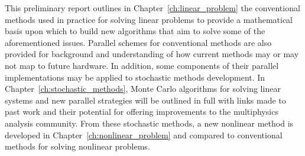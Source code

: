 This preliminary report outlines in Chapter~\ref{ch:linear_problem}
the conventional methods used in practice for solving linear problems
to provide a mathematical basis upon which to build new algorithms
that aim to solve some of the aforementioned issues. Parallel schemes
for conventional methods are also provided for background and
understanding of how current methods may or may not map to future
hardware. In addition, some components of their parallel
implementations may be applied to stochastic methods development. In
Chapter~\ref{ch:stochastic_methods}, Monte Carlo algorithms for
solving linear systems and new parallel strategies will be outlined in
full with links made to past work and their potential for offering
improvements to the multiphysics analysis community. From these
stochastic methods, a new nonlinear method is developed in
Chapter~\ref{ch:nonlinear_problem} and compared to conventional
methods for solving nonlinear problems.
